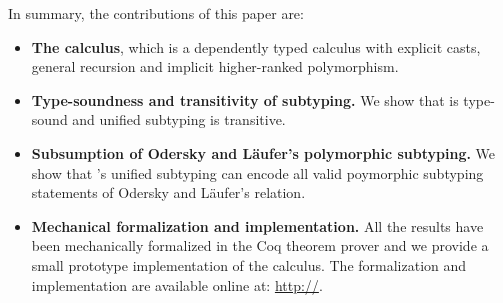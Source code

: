 In summary, the contributions of this paper are:

\begin{itemize}

\item {\bf The \name calculus}, which is a dependently typed calculus with explicit casts,
  general recursion and implicit higher-ranked polymorphism.

\item {\bf Type-soundness and transitivity of subtyping.} We show that \name
  is type-sound and unified subtyping is transitive.

\item {\bf Subsumption of Odersky and L\"aufer's polymorphic subtyping.} We show that \name's
  unified subtyping can encode all valid poymorphic subtyping statements of Odersky and L\"aufer's
  relation.

\item {\bf Mechanical formalization and implementation.} All the results have been mechanically
  formalized in the Coq theorem prover and we provide a small prototype implementation of the
  calculus. The formalization and implementation are available online at: \url{http://}.
  
\end{itemize}
